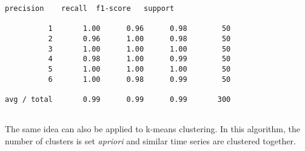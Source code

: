 \documentclass[11pt]{article}
\begin{document}
    \begin{Verbatim}[commandchars=\\\{\}]
             precision    recall  f1-score   support

          1       1.00      0.96      0.98        50
          2       0.96      1.00      0.98        50
          3       1.00      1.00      1.00        50
          4       0.98      1.00      0.99        50
          5       1.00      1.00      1.00        50
          6       1.00      0.98      0.99        50

avg / total       0.99      0.99      0.99       300


    \end{Verbatim}

    The same idea can also be applied to k-means clustering. In this
algorithm, the number of clusters is set \emph{apriori} and similar time
series are clustered together.
\end{document}
